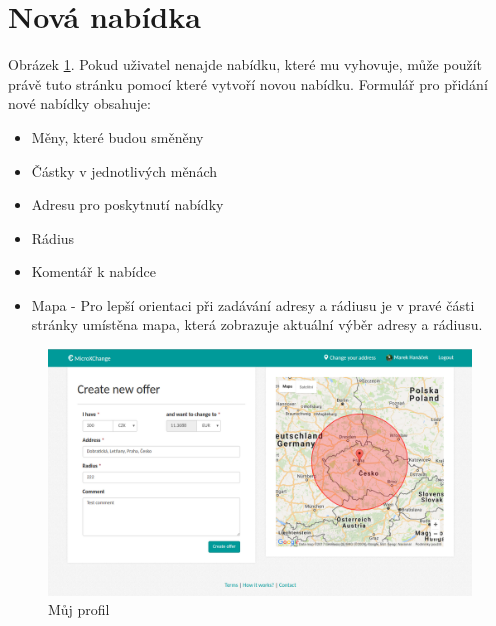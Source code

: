 \section{Nová nabídka}

\label{nur:new-offer}

Obrázek \ref{fig:tur:new-offer}. Pokud uživatel nenajde nabídku, které mu vyhovuje, může použít právě tuto stránku pomocí které vytvoří novou nabídku. Formulář pro přidání nové nabídky obsahuje:
\begin{itemize}
    \item Měny, které budou směněny
    \item Částky v jednotlivých měnách
	\item Adresu pro poskytnutí nabídky
	\item Rádius
	\item Komentář k nabídce
	\item Mapa - Pro lepší orientaci při zadávání adresy a rádiusu je v pravé části stránky umístěna mapa, která zobrazuje aktuální výběr adresy a rádiusu.
\end{itemize}

\begin{figure}[h]
    \centering
    \includegraphics[width=1.0\textwidth]{media/tur/new-offer.png}
    \caption{Můj profil}
    \label{fig:tur:new-offer}
\end{figure}